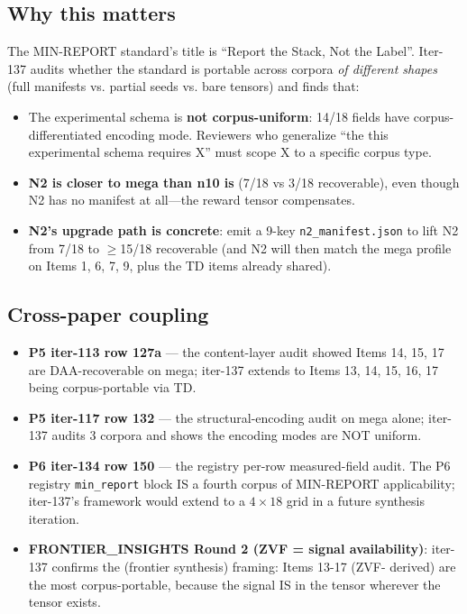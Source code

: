\documentclass{article}  \usepackage[preprint,nonatbib]{neurips_2026} \usepackage[numbers]{natbib}
\begin{document}
\subsection*{Why this matters}

The MIN-REPORT standard's title is ``Report the Stack, Not the Label''.
Iter-137 audits whether the standard is portable across corpora \emph{of
different shapes} (full manifests vs. partial seeds vs. bare tensors) and
finds that:

\begin{itemize}
  \item The experimental schema is \textbf{not corpus-uniform}: 14/18 fields have
    corpus-differentiated encoding mode. Reviewers who generalize ``the
    this experimental schema requires X'' must scope X to a specific corpus
    type.
  \item \textbf{N2 is closer to mega than n10 is} (7/18 vs 3/18 recoverable),
    even though N2 has no manifest at all---the reward tensor compensates.
  \item \textbf{N2's upgrade path is concrete}: emit a 9-key
    \texttt{n2\_manifest.json} to lift N2 from 7/18 to $\geq$15/18
    recoverable (and N2 will then match the mega profile on Items 1, 6, 7,
    9, plus the TD items already shared).
\end{itemize}

\subsection*{Cross-paper coupling}

\begin{itemize}
  \item \textbf{P5 iter-113 row 127a} --- the content-layer audit showed
    Items 14, 15, 17 are DAA-recoverable on mega; iter-137 extends to
    Items 13, 14, 15, 16, 17 being corpus-portable via TD.
  \item \textbf{P5 iter-117 row 132} --- the structural-encoding audit on
    mega alone; iter-137 audits 3 corpora and shows the encoding modes are
    NOT uniform.
  \item \textbf{P6 iter-134 row 150} --- the registry per-row measured-field
    audit. The P6 registry \texttt{min\_report} block IS a fourth corpus
    of MIN-REPORT applicability; iter-137's framework would extend to a
    $4 \times 18$ grid in a future synthesis iteration.
  \item \textbf{FRONTIER\_INSIGHTS Round 2 (ZVF = signal availability)}:
    iter-137 confirms the (frontier synthesis) framing: Items 13-17 (ZVF-
    derived) are the most corpus-portable, because the signal IS in the
    tensor wherever the tensor exists.
\end{itemize}
 
\end{document}

